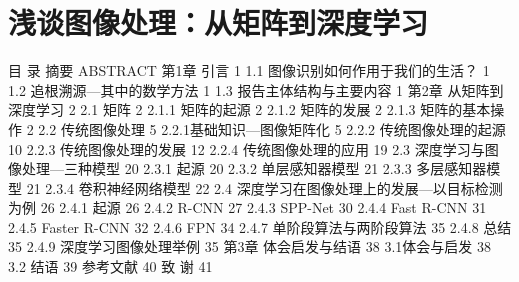 

\section{浅谈图像处理：从矩阵到深度学习}

目  录
摘要
ABSTRACT
第1章  引言	1
1.1 图像识别如何作用于我们的生活？	1
1.2 追根溯源---其中的数学方法	1
1.3 报告主体结构与主要内容	1
第2章  从矩阵到深度学习	2
2.1 矩阵	2
2.1.1 矩阵的起源	2
2.1.2 矩阵的发展	2
2.1.3 矩阵的基本操作	2
2.2 传统图像处理	5
2.2.1基础知识---图像矩阵化	5
2.2.2 传统图像处理的起源	10
2.2.3 传统图像处理的发展	12
2.2.4 传统图像处理的应用	19
2.3 深度学习与图像处理---三种模型	20
2.3.1 起源	20
2.3.2 单层感知器模型	21
2.3.3 多层感知器模型	21
2.3.4 卷积神经网络模型	22
2.4 深度学习在图像处理上的发展---以目标检测为例	26
2.4.1 起源	26
2.4.2 R-CNN	27
2.4.3 SPP-Net	30
2.4.4 Fast R-CNN	31
2.4.5 Faster R-CNN	32
2.4.6 FPN	34
2.4.7 单阶段算法与两阶段算法	35
2.4.8 总结	35
2.4.9 深度学习图像处理举例	35
第3章  体会启发与结语	38
3.1体会与启发	38
3.2 结语	39
参考文献	40
致  谢	41

